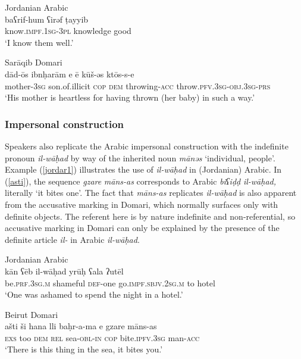 \documentclass[output=paper]{langsci/langscibook}
\begin{document}
\ea
{Jordanian Arabic}\\ \label{jordar}
\gll baʕrif-hum ʕirəf ṭayyib\\
     know.\textsc{impf.1sg-3pl} knowledge good\\
\glt ‘I know them well.’
\z

\ea \label{dados}
{Sarāqib Domari}\\
\gll dād-ōs ibnḥarām e ē kūš-əs ktōs-s-e\\
     mother-\textsc{3sg} son.of.illicit \textsc{cop} \textsc{dem} throwing-\textsc{acc} throw.\textsc{pfv.3sg-obj.3sg-prs}\\
\glt ‘His mother is heartless for having thrown (her baby) in such a way.’
\z


 \subsubsection{Impersonal construction}

Speakers also replicate the Arabic impersonal construction with the indefinite pronoun \textit{il-wāḥad} by way of the inherited noun \textit{mānəs} ‘individual, people’. Example (\ref{jordar1}) illustrates the use of \textit{il-wāḥad} in (Jordanian) Arabic. In (\ref{asti}), the sequence \textit{gzare} \textit{māns-as} corresponds to Arabic \textit{biʕiḍḍ} \textit{il-wāḥad,} literally ‘it bites one’. The fact that \textit{māns-as} replicates \textit{il-wāḥad} is also apparent from the accusative marking in Domari, which normally surfaces only with definite objects. The referent here is by nature indefinite and non-referential, so accusative marking in Domari can only be explained by the presence of the definite article \textit{il-} in Arabic \textit{il-wāḥad}.

\ea
{Jordanian Arabic}\\ \label{jordar1}
\gll kān ʕēb il-wāḥad yrūḥ ʕala ʔutēl\\
     be.\textsc{prf.3sg.m} shameful \textsc{def-}one go.\textsc{impf.sbjv.2sg.m} to hotel\\
\glt ‘One was ashamed to spend the night in a hotel.’
\z

\ea \label{asti}
{Beirut Domari}\\
\gll ašti ši hana lli baḥr-a-ma e gzare māns-as\\
     \textsc{exs} too \textsc{dem} \textsc{rel} sea-\textsc{obl-in} \textsc{cop} bite.\textsc{ipfv.3sg} man-\textsc{acc}\\
\glt ‘There is this thing in the sea, it bites you.’
\z
\end{document}
